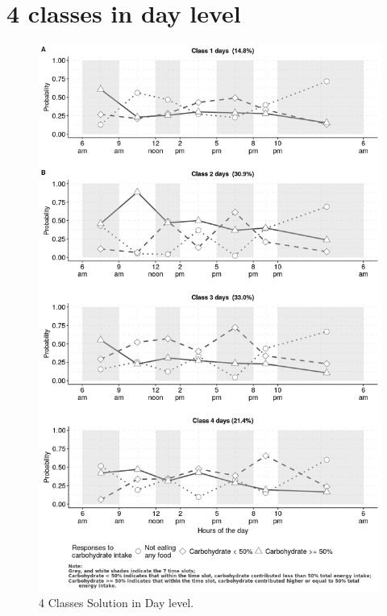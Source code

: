 \section{4 classes in day level}

\begin{figure}[H]
	\centering
	\includegraphics[width=15cm]{Figures/CW4level1.png}
	\decoRule
	\caption[2 Classes Solution in Day level]{4 Classes Solution in Day level.}
	\label{fig:CW4level1}
\end{figure}

